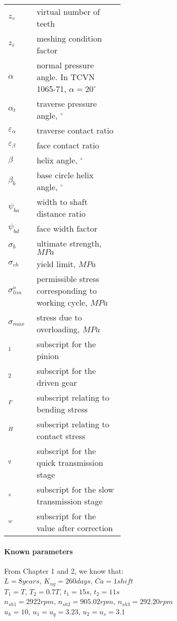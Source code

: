 \begin{tabular}[t]{p{0.05\linewidth}p{0.4\linewidth}}
	
	$ z_v $ & virtual number of teeth\\
	$ z_\varepsilon $ & meshing condition factor\\
	$ \alpha $ & normal pressure angle. In TCVN 1065-71, $ \alpha = 20^\circ $\\
	$ \alpha_t $ & traverse pressure angle, $ ^\circ $\\
	$ \varepsilon_\alpha $ & traverse contact ratio\\
	$ \varepsilon_\beta $ & face contact ratio\\
	$ \beta $ & helix angle, $ ^\circ $\\
	$ \beta_b $ & base circle helix angle, $ ^\circ $\\
	$ \psi_{ba} $ & width to shaft distance ratio\\
	$ \psi_{bd} $ & face width factor \\
	$ \sigma_b $ & ultimate strength, $ \unit{MPa} $\\
	$ \sigma_{ch} $ & yield limit, $ \unit{MPa} $\\
	$ \sigma_{lim}^o $ & permissible stress corresponding to working cycle, $ \unit{MPa} $\\
	$ \sigma_{max} $ & stress due to overloading, $ \unit{MPa} $ \\
	$ _{1} $ & subscript for the pinion \\
	$ _{2} $ & subscript for the driven gear\\
	$ _F $ & subscript relating to bending stress\\
	$ _H $ & subscript relating to contact stress\\
	$ _q $ & subscript for the quick transmission stage\\
	$ _s $ & subscript for the slow transmission stage\\
	$ _w $ & subscript for the value after correction\\
\end{tabular}

\paragraph{Known parameters} From Chapter 1 and 2, we know that:\\
$ L=8\unit{years} $, $ K_{ng}=260\unit{days} $, $ Ca=1\unit{shift} $\\
$ T_1=T$, $T_2=0.7T$, $ t_1=15\unit{s}$, $t_2=11\unit{s} $\\
$ n_{sh1}=2922\unit{rpm} $, $ n_{sh2}=905.02\unit{rpm} $, $ n_{sh3}=292.20\unit{rpm} $\\
$ u_h=10 $, $ u_1 =u_q=3.23$, $ u_2=u_s=3.1 $

